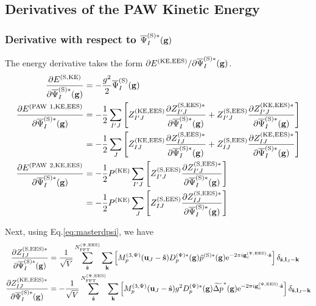 \documentclass[paper=a4, fontsize=11pt]{article} %
\numberwithin{equation}{section} %
\numberwithin{figure}{section} %
\numberwithin{table}{section} %
\newcommand{\p}{\partial}
\newcommand{\wt}{\widetilde}
\newcommand{\bu}{{\bf{u}}}
\newcommand{\bl}{{\bf{l}}}
\newcommand{\bk}{{\bf{k}}}
\newcommand{\bs}{{\bf{s}}}
\newcommand{\bg}{{\bf{g}}}
\newcommand{\rS}{{\mathrm{S}}}
\newcommand{\rKE}{{\mathrm{KE}}}
\newcommand{\rEES}{{\mathrm{EES}}}
\newcommand{\re}{{\mathrm{e}}}
\newcommand{\rP}{{\mathrm{PAW}}}
\newcommand{\gcpEES}{{\bg_c^{(\Psi,\rEES)}}}
\newcommand{\psigs}{{\overline \Psi_I^{(\rS)}(\bg)}}
\newcommand{\psigsc}{{\overline \Psi_I^{(\rS)*}(\bg)}}
\newcommand{\NFFTpEES}{{N^{\mathrm{(\Psi,\rEES})}_{\mathrm{FFT}}}}
\newcommand{\Dpgc}{{D^{(\Psi)*}_p(\bg)}}
\newcommand{\Mp}{{M_p^{(3,\Psi)}}}
\begin{document}
\subsection{Derivatives of the PAW Kinetic Energy}

\subsubsection{Derivative with respect to $\psigsc$}
The energy derivative takes the form $\p E^{(\rKE,\rEES)}/\p \psigsc$. \\
\begin{equation}
\begin{split}
\frac{\p E^{(\rS,\rKE)}}{\p \psigsc}
& = -\frac{g^2 }{2}\psigs \\
\frac{\p E^{(\rP\ 1,\rKE,\rEES)}}{\p \psigsc}
&= -\frac{1}{2} \sum_{I'J}\left[Z_{I'J}^{(\rKE,\rEES)}\frac{\p Z_{I'J}^{(\rS,\rEES)*}}{\p \psigsc} + Z_{I'J}^{(\rS,\rEES)} \frac{\p Z_{I'J}^{(\rKE,\rEES)*}}{\p \psigsc}\right]\\
&= -\frac{1}{2} \sum_{J}\left[Z_{IJ}^{(\rKE,\rEES)}\frac{\p Z_{IJ}^{(\rS,\rEES)*}}{\p \psigsc} + Z_{IJ}^{(\rS,\rEES)} \frac{\p Z_{IJ}^{(\rKE,\rEES)*}}{\p \psigsc}\right]\\
\frac{\p E^{(\rP\ 2,\rKE,\rEES)}}{\p \psigsc}
&= -\frac{1}{2} P^{(\rKE)}\sum_{I'J}\left[Z_{I'J}^{(\rS,\rEES)} \frac{\p Z_{I'J}^{(\rS,\rEES)*}}{\p \psigsc}\right] \\
&= -\frac{1}{2} P^{(\rKE)}\sum_{J}\left[Z_{IJ}^{(\rS,\rEES)}\frac{\p Z_{IJ}^{(\rS,\rEES)*}}{\p \psigsc}\right] \\
\end{split}
\end{equation}


Next, using Eq.\eqref{eq:masterdpsi}, we have
\begin{equation} \label{eq:dZSdpsi}
\begin{split}
\frac{\p Z^{(\rS,\rEES)*}_{IJ}}{\p \psigsc} &= \frac{1}{\sqrt{V}}\sum_{\hat \bs}^{\NFFTpEES} \sum_{\bk} \left[\Mp(\bu_{J}-\hat \bs) \Dpgc \tilde p^{(\rS)*}(\bg)\re^{-2\pi i\gcpEES \cdot \hat\bs}\right] \delta_{\hat \bs,\bl_J-\bk} \\
\frac{\p Z^{(\rKE,\rEES)*}_{IJ}}{\p \psigsc} &= -\frac{1}{\sqrt{V}}\sum_{\hat \bs}^{\NFFTpEES} \sum_{\bk} \left[\Mp(\bu_{J}-\hat \bs) g^2 \Dpgc \wt {\Delta p}^*(\bg)\re^{-2\pi i\gcpEES  \cdot \hat\bs}\right] \delta_{\hat \bs,\bl_J-\bk}
\end{split}
\end{equation}
\end{document}
